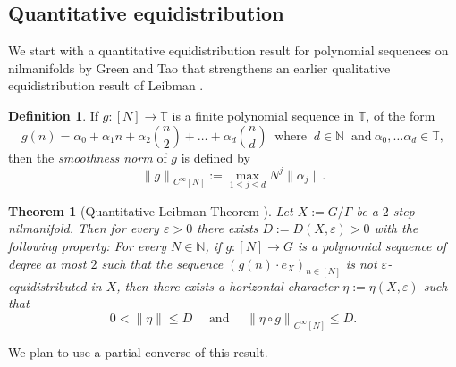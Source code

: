 \documentclass[11pt]{amsart}
\newtheorem{theorem}[lemma]{Theorem}
\theoremstyle{definition}
\newtheorem*{definition}{Definition}
\begin{document}
\subsection{Quantitative equidistribution}
We start with a quantitative equidistribution result for polynomial
sequences on nilmanifolds by Green and Tao \cite{GT12a} that
strengthens an earlier qualitative equidistribution result of
Leibman \cite{L05}.
\begin{definition}
If $g\colon [N]\to {{\mathbb T}}$ is a finite polynomial sequence in
${{\mathbb T}}$, of the form
$$
g(n)=\alpha_0+\alpha_1n+\alpha_2{\binom
n2}+\dots+\alpha_d{\binom nd}\ \text{ where }\  d\in{{\mathbb N}}\ \text{ and
}\ \alpha_0,\dots\alpha_d\in{{\mathbb T}},
$$
then the \emph{smoothness norm} of $g$  is defined by
$$
{\lVert g \rVert}_{C^\infty[N]}:=\max_{1\leq j\leq d} N^j{\lVert {\alpha_j} \rVert}.
$$
 \end{definition}

\begin{theorem}[Quantitative Leibman Theorem \cite{GT12a}]
\label{th:Leibman} Let  $X:=G/\Gamma$ be a $2$-step nilmanifold.
Then for every  $ {\varepsilon}>0$ there exists
$D:=D(X, {\varepsilon})>0$ with the following property: For every
$N\in{{\mathbb N}}$,  if $g\colon [N]\to G$ is a polynomial sequence of degree
at most
 $2$ such that the sequence $(g(n)\cdot e_X)_{n\in[N]}$ is not  ${\varepsilon}$-equidistributed in $X$,
  then there exists
a horizontal character $\eta:=\eta(X,{\varepsilon})$  such that
$$
0<{\lVert \eta \rVert}\leq D\quad \text{ and }\quad {\lVert {\eta\circ
g} \rVert}_{C^\infty[N]}\leq D.
$$
\end{theorem}
We plan to use  a partial converse of this result.
\end{document}
